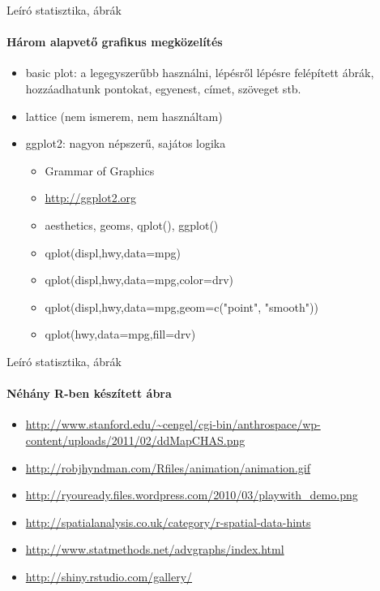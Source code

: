 \documentclass[10pt]{beamer}
\begin{document}
\begin{frame}{Leíró statisztika, ábrák}
\framesubtitle{Három alapvető grafikus megközelítés}
\begin{itemize}
\item basic plot: a legegyszerűbb használni, lépésről lépésre felépített ábrák, hozzáadhatunk pontokat, egyenest, címet, szöveget stb.
\item lattice (nem ismerem, nem használtam)
\item ggplot2: nagyon népszerű, sajátos logika
\begin{itemize}
\item Grammar of Graphics
\item \textcolor{blue}{\url{http://ggplot2.org}}
\item aesthetics, geoms, qplot(), ggplot()
\item qplot(displ,hwy,data=mpg)
\item qplot(displ,hwy,data=mpg,color=drv)
\item qplot(displ,hwy,data=mpg,geom=c("point",	"smooth"))
\item qplot(hwy,data=mpg,fill=drv)
\end{itemize}
\end{itemize}
\end{frame}

\begin{frame}{Leíró statisztika, ábrák}
\framesubtitle{Néhány R-ben készített ábra}
\begin{itemize}
\item \textcolor{blue}{\url{http://www.stanford.edu/~cengel/cgi-bin/anthrospace/wp-content/uploads/2011/02/ddMapCHAS.png}}
\item \textcolor{blue}{\url{http://robjhyndman.com/Rfiles/animation/animation.gif}}
\item \textcolor{blue}{\url{http://ryouready.files.wordpress.com/2010/03/playwith_demo.png}}
\item \textcolor{blue}{\url{http://spatialanalysis.co.uk/category/r-spatial-data-hints}}
\item \textcolor{blue}{\url{http://www.statmethods.net/advgraphs/index.html}}
\item \textcolor{blue}{\url{http://shiny.rstudio.com/gallery/}}
\end{itemize}
\end{frame}
\end{document}
